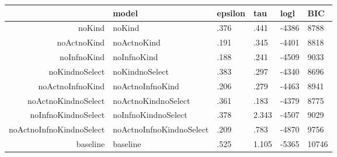 \begin{table}[ht]
\centering
\begin{tabular}{rlllll}
  \hline
 & model & epsilon & tau & logl & BIC \\ 
  \hline
noKind & noKind & .376 & .441 & -4386 & 8788 \\ 
  noActnoKind & noActnoKind & .191 & .345 & -4401 & 8818 \\ 
  noInfnoKind & noInfnoKind & .188 & .241 & -4509 & 9033 \\ 
  noKindnoSelect & noKindnoSelect & .383 & .297 & -4340 & 8696 \\ 
  noActnoInfnoKind & noActnoInfnoKind & .206 & .279 & -4463 & 8941 \\ 
  noActnoKindnoSelect & noActnoKindnoSelect & .361 & .183 & -4379 & 8775 \\ 
  noInfnoKindnoSelect & noInfnoKindnoSelect & .378 & 2.343 & -4507 & 9029 \\ 
  noActnoInfnoKindnoSelect & noActnoInfnoKindnoSelect & .209 & .783 & -4870 & 9756 \\ 
  baseline & baseline & .525 & 1.105 & -5365 & 10746 \\ 
   \hline
\end{tabular}
\end{table}
